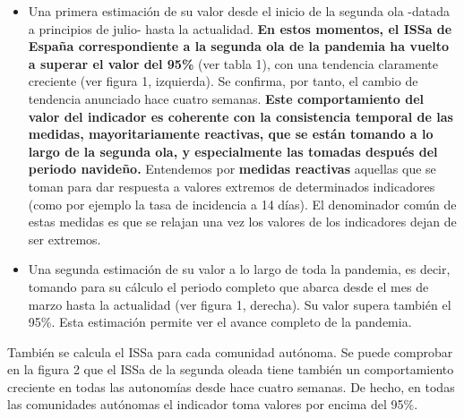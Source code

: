 \documentclass[
  11pt,
]{article}
\begin{document}
\begin{itemize}
\item
  Una primera estimación de su valor desde el inicio de la segunda ola
  -datada a principios de julio- hasta la actualidad. \textbf{En estos
  momentos, el ISSa de España correspondiente a la segunda ola de la
  pandemia ha vuelto a superar el valor del 95\%} (ver tabla 1), con una
  tendencia claramente creciente (ver figura 1, izquierda). Se confirma,
  por tanto, el cambio de tendencia anunciado hace cuatro semanas.
  \textbf{Este comportamiento del valor del indicador es coherente con
  la consistencia temporal de las medidas, mayoritariamente reactivas,
  que se están tomando a lo largo de la segunda ola, y especialmente las
  tomadas después del periodo navideño.} Entendemos por \textbf{medidas
  reactivas} aquellas que se toman para dar respuesta a valores extremos
  de determinados indicadores (como por ejemplo la tasa de incidencia a
  14 días). El denominador común de estas medidas es que se relajan una
  vez los valores de los indicadores dejan de ser extremos.
\item
  Una segunda estimación de su valor a lo largo de toda la pandemia, es
  decir, tomando para su cálculo el periodo completo que abarca desde el
  mes de marzo hasta la actualidad (ver figura 1, derecha). Su valor
  supera también el 95\%. Esta estimación permite ver el avance completo
  de la pandemia.
\end{itemize}

También se calcula el ISSa para cada comunidad autónoma. Se puede
comprobar en la figura 2 que el ISSa de la segunda oleada tiene también
un comportamiento creciente en todas las autonomías desde hace cuatro
semanas. De hecho, en todas las comunidades autónomas el indicador toma
valores por encima del 95\%.
\end{document}
